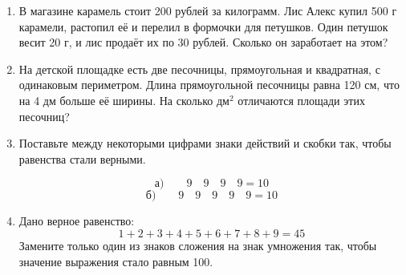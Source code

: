 \begin{enumerate}[itemsep=0.8em]
\noindent
\begin{minipage}[t]{0.47\linewidth}
\textbf{Примеры:}
\begin{itemize}[leftmargin=*,itemsep=0.25em]
\item[А)] $8143512 : 2$
\item[Б)] $3136 \cdot 400$
\item[В)] $94827 + 53529$
\item[Г)] $48 \cdot 26137$
\end{itemize}
\end{minipage}
\hfill
\begin{minipage}[t]{0.47\linewidth}
\textbf{Ответы:}
\begin{itemize}[leftmargin=*,itemsep=0.25em]
\item[1)] $1254400$
\item[2)] $4071756$
\item[3)] $1254576$
\item[4)] $148356$
\end{itemize}
\end{minipage}

\newpage

\item В магазине карамель стоит 200 рублей за килограмм. Лис Алекс купил 500 г карамели, растопил её и перелил в формочки для петушков. Один петушок весит 20 г, и лис продаёт их по 30 рублей. Сколько он заработает на этом?

\item На детской площадке есть две песочницы, прямоугольная и квадратная, с одинаковым периметром. Длина прямоугольной песочницы равна 120 см, что на 4 дм больше её ширины. На сколько дм$^2$ отличаются площади этих песочниц?

\item Поставьте между некоторыми цифрами знаки действий и скобки так, чтобы равенства стали верными.

\[
\text{а)}\qquad 9 \quad 9 \quad 9 \quad 9 = 10
\]
\[
\text{б)}\qquad 9 \quad 9 \quad 9 \quad 9 \quad 9 = 10
\]

\item Дано верное равенство:
\[
1 + 2 + 3 + 4 + 5 + 6 + 7 + 8 + 9 = 45
\]
Замените только один из знаков сложения на знак умножения так, чтобы значение выражения стало равным 100.

\end{enumerate}

